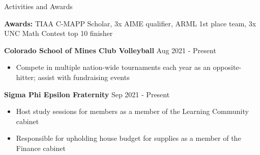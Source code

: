 \documentclass{resume} %
\begin{document}
\begin{rSection}{Activities and Awards} 

\textbf{Awards:} TIAA C-MAPP Scholar, 3x AIME qualifier, ARML 1st place team, 3x UNC Math Contest top 10 finisher
\vspace{-4pt}

\textbf{Colorado School of Mines Club Volleyball} \hfill Aug 2021 - Present
\vspace{-6pt}
 \begin{itemize}
    \itemsep -6pt {} 
     \item Compete in multiple nation-wide tournaments each year as an opposite-hitter; assist with fundraising events
 \end{itemize}
\vspace{-4pt}

\textbf{Sigma Phi Epsilon Fraternity} \hfill Sep 2021 - Present
\vspace{-6pt}
 \begin{itemize}
    \itemsep -6pt {} 
     \item Host study sessions for members as a member of the Learning Community cabinet
     \item Responsible for upholding house budget for supplies as a member of the Finance cabinet
 \end{itemize}
 \vspace{-4pt}
 

\vspace{-4pt}

\end{rSection}
\end{document}
